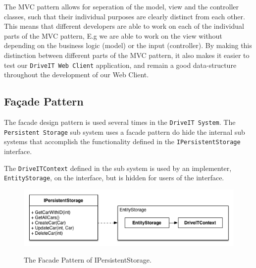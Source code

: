 The MVC pattern allows for seperation of the model, view and the controller classes, such that their individual purposes are clearly distinct from each other. This means that different developers are able to work on each of the individual parts of the MVC pattern, E.g we are able to work on the view without depending on the business logic (model) or the input (controller). By making this distinction between different parts of the MVC pattern, it also makes it easier to test our \texttt{DriveIT Web Client} application, and remain a good data-structure throughout the development of our Web Client.


\subsection{Façade Pattern}
The facade design pattern is used several times in the \texttt{DriveIT System}.
The \texttt{Persistent Storage} sub system uses a facade pattern do hide the internal sub systems that accomplish the functionality defined in the \texttt{IPersistentStorage} interface.

The \texttt{DriveITContext} defined in the sub system is used by an implementer, \texttt{EntityStorage}, on the interface, but is hidden for users of the interface. 

\begin{figure}[H]
	\centering
	\includegraphics[scale=0.6]{Figures/FacadePatternPersistentStorage}\\
	\caption{The Facade Pattern of IPersistentStorage.}
	\label{fig:The Facade Pattern of IPersistentStorage.}
\end{figure}
